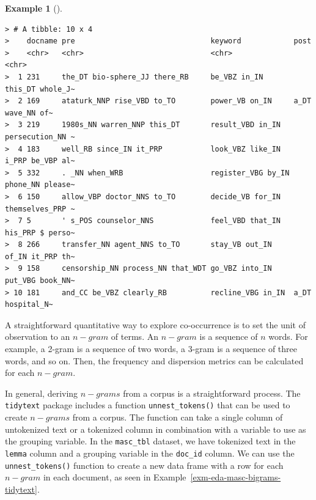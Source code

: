 \documentclass[
  letterpaper,
  DIV=11,
  numbers=noendperiod]{scrreport}
\theoremstyle{definition}
\newtheorem{example}{Example}[chapter]
\theoremstyle{remark}
\begin{document}
\begin{example}[]
\begin{verbatim}
> # A tibble: 10 x 4
>    docname pre                               keyword            post            
>    <chr>   <chr>                             <chr>              <chr>           
>  1 231     the_DT bio-sphere_JJ there_RB     be_VBZ in_IN       this_DT whole_J~
>  2 169     ataturk_NNP rise_VBD to_TO        power_VB on_IN     a_DT wave_NN of~
>  3 219     1980s_NN warren_NNP this_DT       result_VBD in_IN   persecution_NN ~
>  4 183     well_RB since_IN it_PRP           look_VBZ like_IN   i_PRP be_VBP al~
>  5 332     . _NN when_WRB                    register_VBG by_IN phone_NN please~
>  6 150     allow_VBP doctor_NNS to_TO        decide_VB for_IN   themselves_PRP ~
>  7 5       ' s_POS counselor_NNS             feel_VBD that_IN   his_PRP $ perso~
>  8 266     transfer_NN agent_NNS to_TO       stay_VB out_IN     of_IN it_PRP th~
>  9 158     censorship_NN process_NN that_WDT go_VBZ into_IN     put_VBG book_NN~
> 10 181     and_CC be_VBZ clearly_RB          recline_VBG in_IN  a_DT hospital_N~
\end{verbatim}

\end{example}

A straightforward quantitative way to explore co-occurrence is to set
the unit of observation to an \(n-gram\) of terms. An \(n-gram\) is a
sequence of \(n\) words. For example, a 2-gram is a sequence of two
words, a 3-gram is a sequence of three words, and so on. Then, the
frequency and dispersion metrics can be calculated for each \(n-gram\).

In general, deriving \(n-grams\) from a corpus is a straightforward
process. The \texttt{tidytext} package includes a function
\texttt{unnest\_tokens()} that can be used to create \(n-grams\) from a
corpus. The function can take a single column of untokenized text or a
tokenized column in combination with a variable to use as the grouping
variable. In the \texttt{masc\_tbl} dataset, we have tokenized text in
the \texttt{lemma} column and a grouping variable in the
\texttt{doc\_id} column. We can use the \texttt{unnest\_tokens()}
function to create a new data frame with a row for each \(n-gram\) in
each document, as seen in Example~\ref{exm-eda-masc-bigrams-tidytext}.
\end{document}
